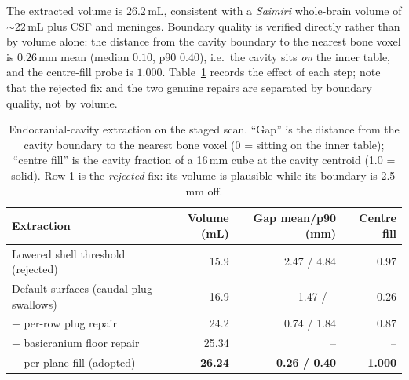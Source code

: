 \documentclass{compactarticle}
\providecommand{\br}{\toprule}
\providecommand{\mr}{\midrule}
\begin{document}
The extracted volume is $26.2$\,mL, consistent with a \emph{Saimiri}
whole-brain volume of ${\sim}22$\,mL plus CSF and meninges. Boundary
quality is verified directly rather than by volume alone: the distance
from the cavity boundary to the nearest bone voxel is $0.26$\,mm mean
(median $0.10$, p90 $0.40$), i.e.\ the cavity sits \emph{on} the inner
table, and the centre-fill probe is $1.000$.
Table~\ref{tab:cavity} records the effect of each step; note that the
rejected fix and the two genuine repairs are separated by boundary
quality, not by volume.

\begin{table}[H]
\centering
\caption{Endocranial-cavity extraction on the staged scan. ``Gap'' is
         the distance from the cavity boundary to the nearest bone voxel
         (0 = sitting on the inner table); ``centre fill'' is the cavity
         fraction of a 16\,mm cube at the cavity centroid (1.0 = solid).
         Row 1 is the \emph{rejected} fix: its volume is plausible while
         its boundary is 2.5\,mm off.}
\label{tab:cavity}
\small
\begin{tabular}{lrrr}
\br
Extraction & Volume (mL) & Gap mean/p90 (mm) & Centre fill \\
\mr
Lowered shell threshold (rejected)  & 15.9 & 2.47 / 4.84 & 0.97 \\
Default surfaces (caudal plug swallows) & 16.9 & 1.47 / -- & 0.26 \\
\quad + per-row plug repair          & 24.2 & 0.74 / 1.84 & 0.87 \\
\quad + basicranium floor repair     & 25.34 & --          & -- \\
\quad + per-plane fill (adopted)     & \textbf{26.24} & \textbf{0.26 / 0.40} & \textbf{1.000} \\
\mr
\end{tabular}
\end{table}
\end{document}
